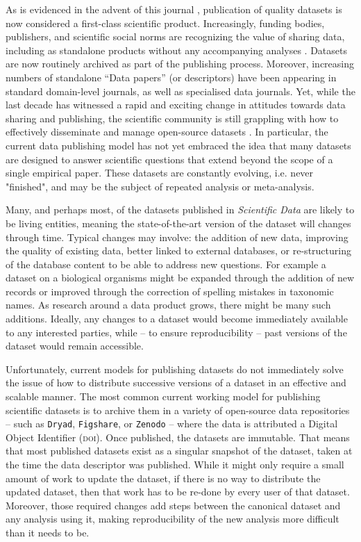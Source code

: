 \documentclass[a4paper,11pt]{article}
\begin{document}
As is evidenced in the advent of this journal \cite{Editorial-2014}, publication of quality datasets is now considered a first-class scientific product. Increasingly, funding bodies, publishers, and scientific social norms are recognizing the value of sharing data, including as standalone products without any accompanying analyses \cite[e.g.][]{Whitlock-2011,Fairbairn-2011,Piwowar-2011,VanNoorden-2013,Gibney-2013}. Datasets are now routinely archived as part of the publishing process. Moreover, increasing numbers of standalone ``Data papers'' (or descriptors) have been appearing in standard domain-level journals, as well as specialised data journals. Yet, while the last decade has witnessed a rapid and exciting change in attitudes towards data sharing and publishing, the scientific community is still grappling with how to effectively disseminate and manage open-source datasets \citep{Whitlock-2011, Goodman-2014, Lowndes-2017,Perkel-2016,VanNoorden-2013, Kratz-2015}. In particular, the current data publishing model has not yet embraced the idea that many  datasets are designed to answer scientific questions that extend beyond the scope of a single empirical paper.  These datasets are constantly evolving, i.e. never "finished", and may be the subject of repeated analysis or meta-analysis.

Many, and perhaps most, of the datasets published in \emph{Scientific Data} are likely to be living entities, meaning the state-of-the-art version of the dataset will changes through time. Typical changes may involve: the addition of new data, improving the quality of existing data, better linked to external databases, or re-structuring of the database content to be able to address new questions. For example a dataset on a biological organisms might be expanded through the addition of new records or improved through the correction of spelling mistakes in taxonomic names. As research around a data product grows, there might be many such additions. Ideally, any changes to a dataset would become immediately available to any interested parties, while -- to ensure reproducibility -- past versions of the dataset would remain accessible.

Unfortunately, current models for publishing datasets do not immediately solve the issue of how to distribute successive versions of a dataset in an effective and scalable manner. The most common current working model for publishing scientific datasets is to archive them in a variety of open-source data repositories -- such as \texttt{Dryad}, \texttt{Figshare}, or \texttt{Zenodo} -- where the data is attributed a Digital Object Identifier (\textsc{doi}). Once published, the datasets are immutable. That means that most published datasets exist as a singular snapshot of the dataset, taken at the time the data descriptor was published. While it might only require a small amount of work to update the dataset, if there is no way to distribute the updated dataset, then that work has to be re-done by every user of that dataset. Moreover, those required changes add steps between the canonical dataset and any analysis using it, making reproducibility of the new analysis more difficult than it needs to be.
\end{document}
